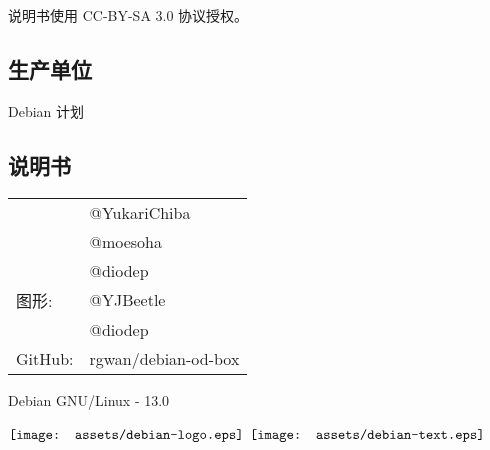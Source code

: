 \documentclass{article}
\begin{document}
\begin{multicols*}{3}
	说明书使用 CC-BY-SA 3.0 协议授权。

	\medskip


	\begin{tcolorbox}
	\section*{生产单位}
	\end{tcolorbox}

	Debian 计划

	\medskip


	\begin{tcolorbox}
	\section*{说明书}
	\end{tcolorbox}
	\begin{tabularx}{\linewidth}{@{}ll@{}}
		\multirow{2}{*}{}{编审：} & @YukariChiba\\
		~ & @moesoha \\
		~ & @diodep \\
		图形: & @YJBeetle\\
		~ & @diodep \\
		GitHub: & rgwan/debian-od-box\\
	\end{tabularx}

	\medskip


	\vfill
	\begin{flushright}
		Debian GNU/Linux - 13.0
		\linebreak
		\newline
		\begin{minipage}{0,5\textwidth}
			\centering
			$\vcenter{\hbox{\texttt{[image: assets/debian-logo.eps]}}}$
			$\vcenter{\hbox{\texttt{[image: assets/debian-text.eps]}}}$
		\end{minipage}
	\end{flushright}

\end{multicols*}
\end{document}
